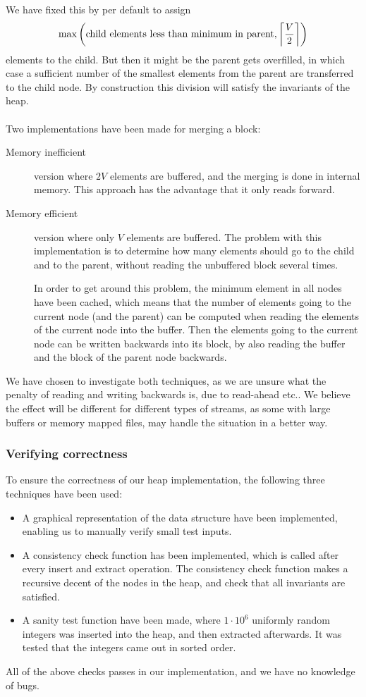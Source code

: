 \documentclass[a4paper,12pt]{article}
\DeclarePairedDelimiter{\ceil}{\lceil}{\rceil}
\begin{document}
We have fixed this by per default to assign
\[
  \max \left( \text{child elements less than minimum in parent}, \ceil*{\frac{V}{2}} \right)
\]
elements to the child. But then it might be the parent gets
overfilled, in which case a sufficient number of the smallest elements
from the parent are transferred to the child node. By construction
this division will satisfy the invariants of the heap.
\\
\\
Two implementations have been made for merging a block:
\begin{description}
\item[Memory inefficient] version where $2V$ elements are buffered,
  and the merging is done in internal memory. This approach has the
  advantage that it only reads forward.
\item[Memory efficient] version where only $V$ elements are
  buffered. The problem with this implementation is to determine how
  many elements should go to the child and to the parent, without
  reading the unbuffered block several times.

  In order to get around this problem, the minimum element in all
  nodes have been cached, which means that the number of elements
  going to the current node (and the parent) can be computed when
  reading the elements of the current node into the buffer. Then the
  elements going to the current node can be written backwards into its
  block, by also reading the buffer and the block of the parent node
  backwards.
\end{description}
We have chosen to investigate both techniques, as we are unsure what
the penalty of reading and writing backwards is, due to read-ahead
etc.. We believe the effect will be different for different types of
streams, as some with large buffers or memory mapped files, may handle
the situation in a better way.

\subsubsection{Verifying correctness}
To ensure the correctness of our heap implementation, the following
three techniques have been used:
\begin{itemize}
\item A graphical representation of the data structure have been
  implemented, enabling us to manually verify small test inputs.
\item A consistency check function has been implemented, which is
  called after every insert and extract operation. The consistency
  check function makes a recursive decent of the nodes in the heap,
  and check that all invariants are satisfied.
\item A sanity test function have been made, where $1\cdot 10^6$
  uniformly random integers was inserted into the heap, and then
  extracted afterwards. It was tested that the integers came out in
  sorted order.
\end{itemize}
All of the above checks passes in our implementation, and we have no
knowledge of bugs.
\end{document}
